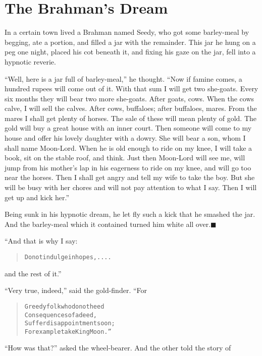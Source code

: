 \documentclass[article, twoside, 14pt]{memoir}
\newcommand{\qed}{\hfill \ensuremath{\blacksquare}}
\renewenvironment{verbatim}{%
\begin{quote}%
\vskip -10pt%
\begin{alltt}\normalfont\large}{\end{alltt}%
\end{quote}%
\vskip -10pt
} %
\begin{document}
\chapter{The Brahman's Dream}

\label{s86}

In a certain town lived a Brahman named Seedy, who got some
barley-meal by begging, ate a portion, and filled a jar with the
remainder. This jar he hung on a peg one night, placed his cot
beneath it, and fixing his gaze on the jar, fell into a hypnotic
reverie.

``Well, here is a jar full of barley-meal,'' he thought.
``Now if famine comes, a hundred rupees will come out of it. With that sum I will get two she-goats. Every six months they will bear two more she-goats. After goats, cows. When the cows calve, I will sell the calves. After cows, buffaloes; after buffaloes, mares. From the mares I shall get plenty of horses. The sale of these will mean plenty of gold. The gold will buy a great house with an inner court. Then someone will come to my house and offer his lovely daughter with a dowry. She will bear a son, whom I shall name Moon-Lord. When he is old enough to ride on my knee, I will take a book, sit on the stable roof, and think. Just then Moon-Lord will see me, will jump from his mother's lap in his eagerness to ride on my knee, and will go too near the horses. Then I shall get angry and tell my wife to take the boy. But she will be busy with her chores and will not pay attention to what I say. Then I will get up and kick her.''

Being sunk in his hypnotic dream, he let fly such a kick that he
smashed the jar. And the barley-meal which it contained turned him
white all over.\hyperref[s86]{\qed}

“And that is why I say:

\begin{verbatim}
Do not indulge in hopes, ....
\end{verbatim}
and the rest of it.”

``Very true, indeed,'' said the gold-finder. “For

\begin{verbatim}
Greedy folk who do not heed
Consequences of a deed,
Suffer disappointment soon;
For example take King Moon.”
\end{verbatim}
``How was that?'' asked the wheel-bearer. And the other told the
story of
\end{document}
